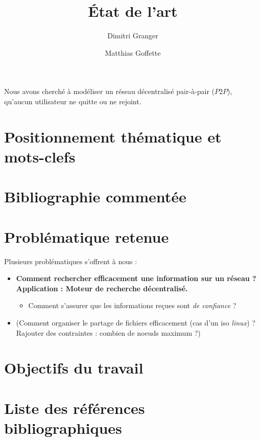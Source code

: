 \documentclass[11pt,a4paper]{article}
\title{\'Etat de l'art}
\date{}
\author{Dimitri Granger \and Matthias Goffette}
\begin{document}

\maketitle

\begin{it}
Nous avons cherché à modéliser un réseau décentralisé pair-à-pair ($P2P$), qu'aucun utilisateur ne quitte ou ne rejoint.
\end{it}

\section{Positionnement thématique et mots-clefs}

\section{Bibliographie commentée}

\section{Problématique retenue}

Plusieurs problématiques s'offrent à nous :
\begin{itemize}

	\item \textbf{Comment rechercher efficacement une information sur un réseau ? Application : Moteur de recherche décentralisé.}
	\begin{itemize}
		\item Comment s'assurer que les informations reçues sont \emph{de confiance} ?
	\end{itemize}
	
	\item (Comment organiser le partage de fichiers efficacement (cas d'un iso \emph{linux}) ? Rajouter des contraintes : combien de noeuds maximum ?)
	
\end{itemize}

\section{Objectifs du travail}

\section{Liste des références bibliographiques}
\end{document}
